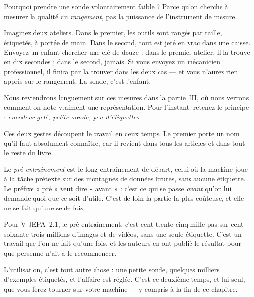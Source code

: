\begin{intuition}
Pourquoi prendre une sonde volontairement faible ? Parce qu'on cherche à
mesurer la qualité du \emph{rangement}, pas la puissance de l'instrument de
mesure.

Imaginez deux ateliers. Dans le premier, les outils sont rangés par taille,
étiquetés, à portée de main. Dans le second, tout est jeté en vrac dans une
caisse. Envoyez un enfant chercher une clé de douze : dans le premier
atelier, il la trouve en dix secondes ; dans le second, jamais. Si vous
envoyez un mécanicien professionnel, il finira par la trouver dans les deux
cas — et vous n'aurez rien appris sur le rangement. La sonde, c'est l'enfant.
\end{intuition}

Nous reviendrons longuement sur ces mesures dans la partie~III, où nous
verrons comment on note vraiment une représentation. Pour l'instant, retenez
le principe : \emph{encodeur gelé, petite sonde, peu d'étiquettes}.

Ces deux gestes découpent le travail en deux temps. Le premier porte un nom
qu'il faut absolument connaître, car il revient dans tous les articles et
dans tout le reste du livre.

\begin{definition}
Le \emph{pré-entraînement} est le long entraînement de départ, celui où la
machine joue à la tâche prétexte sur des montagnes de données brutes, sans
aucune étiquette. Le préfixe « pré » veut dire « avant » : c'est ce qui se
passe \emph{avant} qu'on lui demande quoi que ce soit d'utile. C'est de loin
la partie la plus coûteuse, et elle ne se fait qu'une seule fois.
\end{definition}

\begin{exemple}
Pour V-JEPA~2.1, le pré-entraînement, c'est cent trente-cinq mille pas sur
cent soixante-trois millions d'images et de vidéos, sans une seule étiquette.
C'est un travail que l'on ne fait qu'une fois, et les auteurs en ont publié
le résultat pour que personne n'ait à le recommencer.

L'utilisation, c'est tout autre chose : une petite sonde, quelques milliers
d'exemples étiquetés, et l'affaire est réglée. C'est ce deuxième temps, et
lui seul, que vous ferez tourner sur votre machine — y compris à la fin de ce
chapitre.
\end{exemple}

